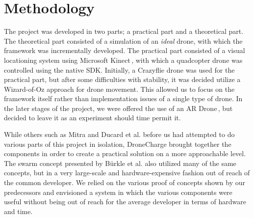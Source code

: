 \section{Methodology}
The project was developed in two parts; a practical part and a theoretical part. The theoretical part consisted of a simulation of an \textit{ideal} drone, with which the framework was incrementally developed. The practical part consisted of a visual locationing system using Microsoft Kinect\,\cite{kinect}, with which a quadcopter drone was controlled using the native SDK. Initially, a Crazyflie drone was used for the practical part, but after some difficulties with stability, it was decided utilize a Wizard-of-Oz approach for drone movement. This allowed us to focus on the framework itself rather than implementation issues of a single type of drone.	In the later stages of the project, we were offered the use of an AR Drone\,\cite{ardrone}, but decided to leave it as an experiment should time permit it.

While others such as Mitra and Ducard et al. before us had attempted to do various parts of this project in isolation, DroneCharge brought together the components in order to create a practical solution on a more approachable level. The swarm concept presented by B\"urkle et al. also utilized many of the same concepts, but in a very large-scale and hardware-expensive fashion out of reach of the common developer. We relied on the various proof of concepts shown by our predecessors and envisioned a system in which the various components were useful without being out of reach for the average developer in terms of hardware and time.